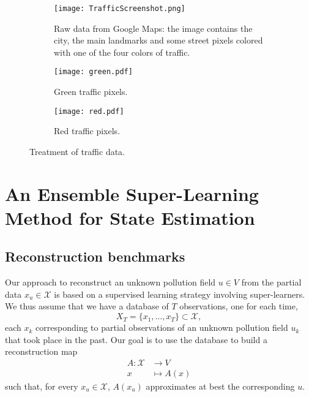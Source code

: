 \documentclass[11pt,a4paper,twoside]{article}
\theoremstyle{definition}
\numberwithin{equation}{section}
\newcommand{\cX}{\ensuremath{\mathcal{X}}}
\newcommand{\<}{\langle}
\renewcommand{\>}{\rangle}
\begin{document}
\begin{figure}
      \centering
      \begin{subfigure}[b]{0.6\textwidth}
          \centering
          \texttt{[image: TrafficScreenshot.png]}
          \caption{Raw data from Google Maps: the image contains the city, the main landmarks and some street pixels colored with one of the four colors of traffic.}
          \label{fig:traffic-raw-data}
      \end{subfigure}
      \hfill
      \begin{subfigure}[b]{0.45\textwidth}
          \centering
          \texttt{[image: green.pdf]}
          \caption{Green traffic pixels. }
          \label{fig:green-traffic}
      \end{subfigure}
      \begin{subfigure}[b]{0.45\textwidth}
          \centering
          \texttt{[image: red.pdf]}
          \caption{Red traffic pixels. }
          \label{fig:red-traffic}
      \end{subfigure}
      \caption{Treatment of traffic data.}
      \label{fig:traffic-preprocess}
 \end{figure}




\section{An Ensemble Super-Learning Method for State Estimation}
\label{sec:rigorous}

\subsection{Reconstruction benchmarks}
Our approach to reconstruct an unknown pollution field $u\in V$ from the partial data $x_u\in \cX$ is based on a supervised learning strategy involving super-learners. We thus assume that we have a database of $T$ observations, one for each time,
$$
X_T = \{x_1,\dots, x_T\} \subset \cX,
$$
each $x_k$ corresponding to partial observations of an unknown pollution field $u_k$ that took place in the past. Our goal is to use the database to build a reconstruction map
\begin{align*}
A: \cX &\to V \\
x &\mapsto A(x)
\end{align*}
such that, for every $x_u\in \cX$, $A(x_u)$ approximates at best the corresponding $u$.
\end{document}
